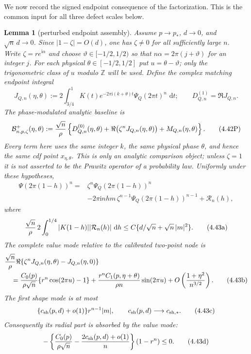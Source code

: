 \documentclass[11pt,a4paper]{article}
\numberwithin{equation}{section}
\newtheorem{lemma}[theorem]{Lemma}
\theoremstyle{definition}
\theoremstyle{remark}
\newcommand{\ii}{\mathrm i}
\newcommand{\dd}{\,\mathrm d}
\begin{document}
We now record the signed endpoint consequence of the factorization.  This
is the common input for all three defect scales below.

\begin{lemma}[perturbed endpoint assembly]\label{orig:lem:pertendpoint}
Assume $p\to p_*$, $d\to0$, and $\sqrt n\,d\to0$.  Since
$|1-\zeta|=O(d)$, one has $\zeta\ne0$ for all sufficiently large $n$.
Write $\zeta=re^{\ii\alpha}$ and choose
$\vartheta\in[-1/2,1/2)$ so that
$n\alpha=2\pi(j+\vartheta)$ for an integer $j$.  For each physical
$\theta\in[-1/2,1/2]$ put $u=\theta-\vartheta$; only the trigonometric
class of $u$ modulo $\mathbb Z$ will be used.  Define the complex matching
endpoint integral
\[
 J_{Q,n}(\eta,\theta):=2\int_{3/4}^1K(t)
 e^{-2\pi\ii(k+\theta)t}\Psi_Q(2\pi t)^n\,\dd t;
 \qquad D^{(1)}_{Q,n}=\Re J_{Q,n}.
\]
The phase-modulated analytic baseline is
\[
 \mathcal B^+_{n,p,\zeta}(\eta,\theta)
 :={\sqrt n\over\rho}\left\{
 D^{(0)}_{Q,n}(\eta,\theta)
 +\Re\bigl(\zeta^nJ_{Q,n}(\eta,\theta)\bigr)
 +M_{Q,n}(\eta,\theta)\right\}.                    \tag{4.42P}
\]
Every term here uses the same integer $k$, the same physical phase
$\theta$, and hence the same cdf point $x_{\eta,\theta}$.  This is only an
analytic comparison object; unless $\zeta=1$ it is not asserted to be the
Prawitz operator of a probability law.
Uniformly under these hypotheses,
\begin{equation}\tag{4.43}
\begin{split}
 \Psi(2\pi(1-h))^n={}&\zeta^n\Psi_Q(2\pi(1-h))^n\\
 &-2\pi\ii nhm\,\zeta^{n-1}
          \Psi_Q(2\pi(1-h))^{n-1}+\mathcal R_n(h),
\end{split}
\end{equation}
where
\[
 {\sqrt n\over\rho}\,2\int_0^{1/4}|K(1-h)|
             |\mathcal R_n(h)|\,\dd h
 \le C\{d/\sqrt n+\sqrt n\,|m|^2\}.                 \tag{4.43a}
\]
The complete value mode relative to the calibrated two-point node is
\begin{align*}
 &{\sqrt n\over\rho}\Re\{\zeta^nJ_{Q,n}(\eta,\theta)
                         -J_{Q,n}(\eta,0)\}\\
 &\quad={C_0(p)\over\rho\sqrt n}
              \{r^n\cos(2\pi u)-1\}
 +{r^nC_1(p,\eta+\theta)\over\rho n}\sin(2\pi u)
 +O\left({1+\eta^2\over n^{3/2}}\right).             \tag{4.43b}
\end{align*}
The first shape mode is at most
\[
 \{c_{\rm sh}(p,d)+o(1)\}r^{n-1}|m|,
 \qquad c_{\rm sh}(p,d)\longrightarrow c_{\rm sh,*}. \tag{4.43c}
\]
Consequently its radial part is absorbed by the value mode:
\[
 -\left\{{C_0(p)\over\rho\sqrt n}
       -{2c_{\rm sh}(p,d)+o(1)\over n}\right\}(1-r^n)\le0.
                                                                  \tag{4.43d}
\]


\end{lemma}
\end{document}
